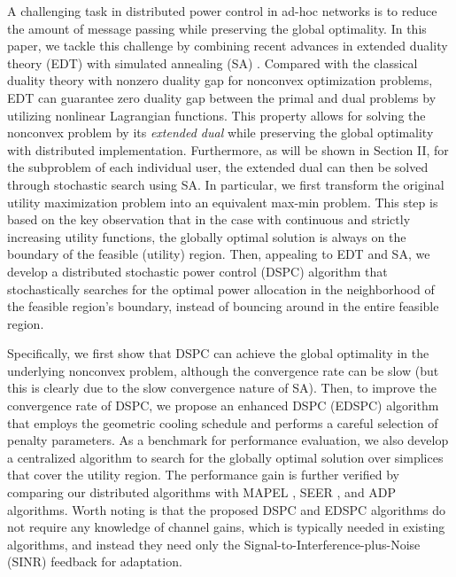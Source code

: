 \documentclass[10pt,journal,letterpaper,compsoc]{IEEEtran}
\begin{document}
A challenging task in  distributed power control in ad-hoc networks is to reduce the amount of message passing while preserving the global optimality. In this paper, we tackle this challenge by combining recent advances in extended duality theory (EDT) \cite{chen:2008} with simulated annealing (SA) \cite{Kirkpatrick:1983}. Compared with the classical duality theory with nonzero duality gap for nonconvex optimization problems, EDT can guarantee zero duality gap between the primal and dual problems by utilizing nonlinear Lagrangian functions. This property allows for solving the nonconvex problem by its \emph{extended dual} while preserving the global optimality with distributed implementation. Furthermore, as will be shown in Section II, for the subproblem of each individual user, the extended dual can then be solved through stochastic search using SA. In particular, we first transform the original utility maximization problem into an equivalent max-min problem. This step is based on the key observation that in the case with continuous and strictly increasing utility functions, the globally optimal solution is always on the boundary of the feasible (utility) region. Then, appealing to EDT and SA, we develop a distributed stochastic power control (DSPC) algorithm that stochastically searches for the optimal power allocation in the neighborhood of the feasible region's boundary, instead of bouncing around in the entire feasible region.

Specifically, we first show that DSPC can achieve the global optimality in the underlying nonconvex problem, although the convergence rate can be slow (but this is clearly due to the slow convergence nature of SA). Then, to improve the convergence rate of DSPC, we propose an enhanced DSPC (EDSPC) algorithm that employs the geometric cooling schedule and performs a careful selection of penalty parameters. As a benchmark for performance evaluation, we also develop a centralized algorithm to search for the globally optimal solution over simplices that cover the utility region. The performance gain is further verified by comparing our distributed algorithms with MAPEL \cite{qian:2009}, SEER \cite{qian:2010}, and ADP \cite{huang:2006} algorithms. Worth noting is that the proposed DSPC and EDSPC algorithms do not require any knowledge of channel gains, which is typically needed in existing algorithms, and instead they need only the Signal-to-Interference-plus-Noise (SINR) feedback for adaptation.
\end{document}
